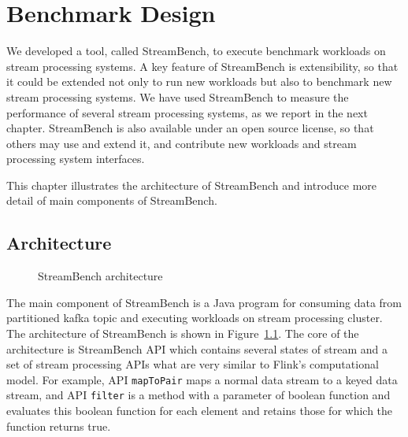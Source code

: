 \chapter{Benchmark Design}
We developed a tool, called StreamBench, to execute benchmark workloads on stream processing systems. A key feature of StreamBench is extensibility, so that it could be extended not only to run new workloads but also to benchmark new stream processing systems. We have used StreamBench to measure the performance of several stream processing systems, as we report in the next chapter.  StreamBench is also available under an open source license, so that others may use and extend it, and contribute new workloads and stream processing system interfaces.

This chapter illustrates the architecture of StreamBench and introduce more detail of main components of StreamBench. 

\section{Architecture}

\begin{figure}
  \begin{center}
   \caption{StreamBench architecture}
   \label{fig:streambench_architecture}
  \end{center}
\end{figure}

The main component of StreamBench is a Java program for consuming data from partitioned kafka topic and executing workloads on stream processing cluster. The architecture of StreamBench is shown in Figure~\ref{fig:streambench_architecture}. The core of the architecture is StreamBench API which contains several states of stream and a set of stream processing APIs what are very similar to Flink's computational model. For example, API \texttt{mapToPair} maps a normal data stream to a keyed data stream, and API \texttt{filter} is a method with a parameter of boolean function and evaluates this boolean function for each element and retains those for which the function returns true. 

